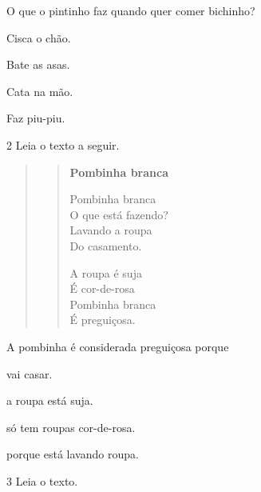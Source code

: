 O que o pintinho faz quando quer comer bichinho?

\begin{escolha}
	\item Cisca o chão.

	\item Bate as asas.

	\item Cata na mão.

	\item Faz piu-piu.
\end{escolha}

\pagebreak
\num{2} Leia o texto a seguir.

\begin{quote}
\begin{verse}
\textbf{Pombinha branca}

Pombinha branca \\
O que está fazendo?\\
Lavando a roupa\\
Do casamento.

A roupa é suja\\
É cor-de-rosa\\
Pombinha branca\\
É preguiçosa.

\end{verse}

\end{quote}

A pombinha é considerada preguiçosa porque

\begin{escolha}
	\item vai casar.

	\item a roupa está suja.

	\item só tem roupas cor-de-rosa.

	\item porque está lavando roupa.
\end{escolha}

\pagebreak
\num{3} Leia o texto.

